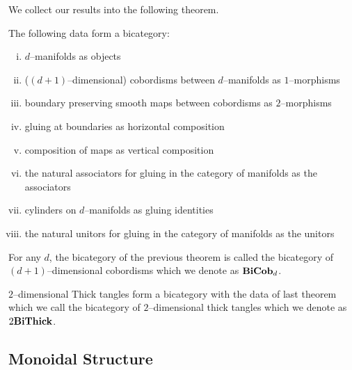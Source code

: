 \documentclass[./Thick_TQFTs_and_Quantum_Information.tex]{subfiles}
\begin{document}
We collect our results into the following theorem.
\begin{thm}
The following data form a bicategory:
\begin{enumerate}[(i)]
\setlength{\itemsep}{0pt}
\item $d$--manifolds as objects
\item ($(d + 1)$--dimensional) cobordisms between $d$--manifolds as
$1$--morphisms
\item boundary preserving smooth maps between cobordisms as $2$--morphisms
\item gluing at boundaries as horizontal composition
\item composition of maps as vertical composition
\item the natural associators for gluing in the category of manifolds as the
associators
\item cylinders on $d$--manifolds as gluing identities
\item the natural unitors for gluing in the category of manifolds as the unitors
\end{enumerate}
\end{thm}

\begin{defn}
For any $d$, the bicategory of the previous theorem is called the bicategory of
$(d + 1)$--dimensional cobordisms which we denote as $\textbf{BiCob}_d$.
\end{defn}

\begin{defn}
$2$--dimensional Thick tangles form a bicategory with the data of last theorem
which we call the bicategory of $2$--dimensional thick tangles which we denote
as $2\textbf{BiThick}$.
\end{defn}

\subsection{Monoidal Structure}
\end{document}
